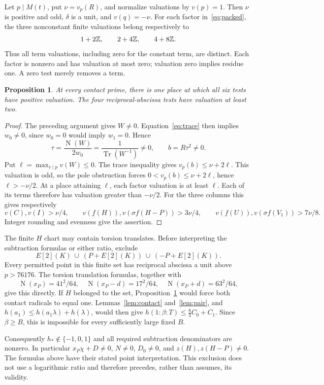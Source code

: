 \documentclass[11pt,a4paper]{article}
\newtheorem{proposition}[theorem]{Proposition}
\DeclareMathOperator{\Tr}{Tr}\DeclareMathOperator{\Nm}{N}
\begin{document}
Let $p\mid M(t)$, put $\nu=v_p(R)$, and normalize valuations by
$v(p)=1$. Then $\nu$ is positive and odd, $\delta$ is a unit, and
$v(q)=-\nu$. For each factor in~\eqref{eq:packed}, the three
nonconstant finite valuations belong respectively to
\[
                     1+2\mathbb Z,\qquad 2+4\mathbb Z,\qquad4+8\mathbb Z.
\]
Thus all term valuations, including zero for the constant term, are
distinct. Each factor is nonzero and has valuation at most zero;
valuation zero implies residue one. A zero test merely removes a term.

\begin{proposition}\label{prop:local}
At every contact prime, there is one place at which all six tests have
positive valuation. The four reciprocal-abscissa tests have valuation
at least two.
\end{proposition}
\begin{proof}
The preceding argument gives $W\ne0$. Equation~\eqref{eq:trace} then
implies $w_0\ne0$, since $w_0=0$ would imply $w_1=0$. Hence
\[
 \tau=\frac{\Nm(W)}{2w_0}=\frac1{\Tr(W^{-1})}\ne0,
 \qquad b=R\tau^2\ne0.
\]
Put $\ell=\max_{v\mid p}v(W)\le0$. The trace inequality gives
$v_p(b)\le\nu+2\ell$. This valuation is odd, so the pole obstruction
forces $0<v_p(b)\le\nu+2\ell$, hence $\ell>-\nu/2$.
At a place attaining $\ell$, each factor valuation is at least $\ell$.
Each of its terms therefore has valuation greater than $-\nu/2$.
For the three columns this gives respectively
\[
 v(C),v(I)>\nu/4,\qquad
 v(f(H)),v(\sigma f(H-P))>3\nu/4,\qquad
 v(f(U)),v(\sigma f(V_1))>7\nu/8.
\]
Integer rounding and evenness give the assertion.
\end{proof}

The finite $H$ chart may contain torsion translates. Before interpreting
the subtraction formulas or either ratio, exclude
\[
                  E[2](K)\ \cup\ (P+E[2](K))\ \cup\ (-P+E[2](K)).
\]
Every permitted point in this finite set has reciprocal abscissa a unit
above $p>76176$. The torsion translation formulas, together with
\[
 \Nm(x_P)=41^2/64,\quad
 \Nm(x_P-d)=17^2/64,\quad \Nm(x_P+d)=63^2/64,
\]
give this directly. If $H$ belonged to the set, Proposition~\ref{prop:local}
would force both contact radicals to equal one. Lemmas~\ref{lem:contact}
and~\ref{lem:pair}, and $h(a_1)\le h(a_1\lambda)+h(\lambda)$, would
then give $h(1:\beta:T)\le\frac83C_0+C_1$. Since $\beta\ge B$, this is
impossible for every sufficiently large fixed $B$.

Consequently $h_*\notin\{-1,0,1\}$ and all required subtraction
denominators are nonzero. In particular $x_P\chi+D\ne0$, $N\ne0$,
$D_0\ne0$, and $z(H),z(H-P)\ne0$. The formulas above have their
stated point interpretation. This exclusion does not use a logarithmic
ratio and therefore precedes, rather than assumes, its validity.
\end{document}
